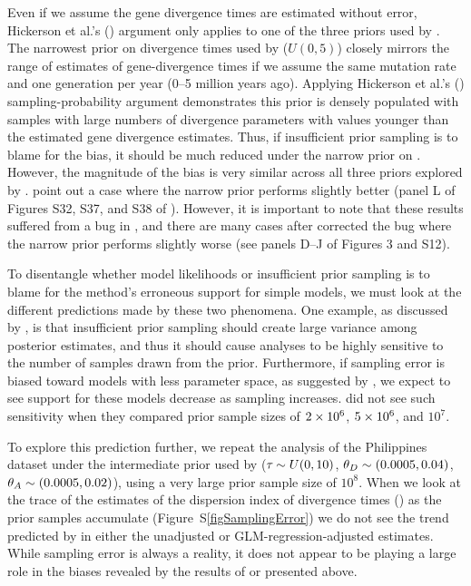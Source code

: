 Even if we assume the gene divergence times are estimated without error,
Hickerson et al.'s (\citeyear{Hickerson2013}) argument only applies to one of
the three priors used by \citet{Oaks2012}.
The narrowest prior on divergence times used by \citet{Oaks2012} ($U(0, 5)$)
closely mirrors the range of estimates of gene-divergence times if we assume
the same mutation rate and one generation per year (0--5 million years ago).
Applying Hickerson et al.'s (\citeyear{Hickerson2013}) sampling-probability
argument demonstrates this prior is densely populated with samples with large
numbers of divergence parameters with values younger than the estimated gene
divergence estimates.
Thus, if insufficient prior sampling is to blame for the bias, it should be
much reduced under the narrow prior on \divt{}.
However, the magnitude of the bias is very similar across all three priors
explored by \citet{Oaks2012}.
\citet{Hickerson2013} point out a case where the narrow prior performs
slightly better (panel L of Figures S32, S37, and S38 of \citet{Oaks2012}).
However, it is important to note that these results suffered from a bug
in \msb, and there are many cases after \citet{Oaks2012} corrected the 
bug where the narrow prior performs slightly worse (see panels D--J of
Figures 3 and S12).

To disentangle whether model likelihoods or insufficient prior sampling is to
blame for the method's erroneous support for simple models, we must look at the
different predictions made by these two phenomena.
One example, as discussed by \citet{Oaks2012}, is that insufficient prior
sampling should create large variance among posterior estimates, and thus it
should cause analyses to be highly sensitive to the number of samples drawn
from the prior.
Furthermore, if sampling error is biased toward models with less
parameter space, as suggested by \citet{Hickerson2013}, we expect to see
support for these models decrease as sampling increases.
\citet{Oaks2012} did not see such sensitivity when they compared prior sample
sizes of $2\times 10^{6}$, $5\times 10^{6}$, and $10^7$.

To explore this prediction further, we repeat the analysis of the Philippines
dataset under the intermediate prior used by \citet{Oaks2012} ($\tau_{} \sim
U(0, 10)$, $\meanDescendantTheta{} \sim (0.0005, 0.04)$, $\ancestralTheta{}
\sim (0.0005, 0.02)$), using a very large prior sample size of $10^8$.
When we look at the trace of the estimates of the dispersion index of
divergence times (\vmratio{}) as the prior samples accumulate
(Figure~S\ref{figSamplingError}) we do not see the trend predicted by
\citet{Hickerson2013} in either the unadjusted or GLM-regression-adjusted
estimates.
While sampling error is always a reality, it does not appear to be playing a
large role in the biases revealed by the results of \citet{Oaks2012} or
presented above.

